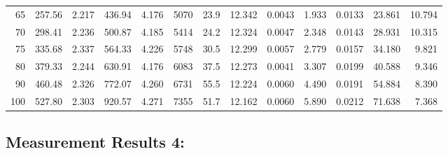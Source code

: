 \documentclass[10pt]{article}
\begin{document}
{\begin{tabular}{|r|rr|rr|rr|rr|rr|r|r|}
       65 &       257.56 &        2.217 &       436.94 &        4.176 &         5070 &         23.9 &       12.342 &       0.0043 &        1.933 &       0.0133 &       23.861 &       10.794 \\
       70 &       298.41 &        2.236 &       500.87 &        4.185 &         5414 &         24.2 &       12.324 &       0.0047 &        2.348 &       0.0143 &       28.931 &       10.315 \\
       75 &       335.68 &        2.337 &       564.33 &        4.226 &         5748 &         30.5 &       12.299 &       0.0057 &        2.779 &       0.0157 &       34.180 &        9.821 \\
       80 &       379.33 &        2.244 &       630.91 &        4.176 &         6083 &         37.5 &       12.273 &       0.0041 &        3.307 &       0.0199 &       40.588 &        9.346 \\
       90 &       460.48 &        2.326 &       772.07 &        4.260 &         6731 &         55.5 &       12.224 &       0.0060 &        4.490 &       0.0191 &       54.884 &        8.390 \\
      100 &       527.80 &        2.303 &       920.57 &        4.271 &         7355 &         51.7 &       12.162 &       0.0060 &        5.890 &       0.0212 &       71.638 &        7.368 \\
\hline
\end{tabular}
}



\subsection*{\large \bf Measurement Results 4:}
\end{document}
